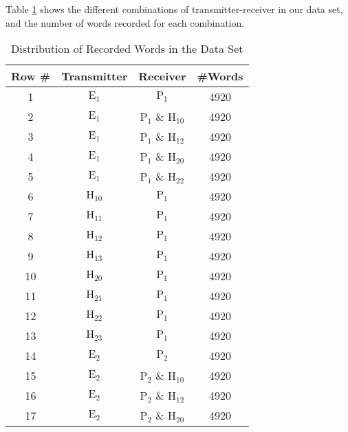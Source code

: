 \documentclass[compsoc,conference,a4paper]{IEEEtran}
\begin{document}
  Table \ref{tab:RecordingsSummery} shows the different combinations of transmitter-receiver in our data set, and the number of words recorded for each combination.
  
  \begin{table}
    \caption{Distribution of Recorded Words in the Data Set}
    \label{tab:RecordingsSummery}
    \centering
    \begin{tabular}{|c | c c c|} 
      \hline
      Row \# & Transmitter & Receiver & \#Words \\ [0.5ex] 
      \hline\hline
      1 & \(\text{E}_1\) & \(\text{P}_1\) & 4920 \\ %
      \hline
      2 & \(\text{E}_1\) & \(\text{P}_1\) \& \(\text{H}_{10}\) & 4920 \\
      \hline
      3 & \(\text{E}_1\) & \(\text{P}_1\) \& \(\text{H}_{12}\) & 4920 \\
      \hline
      4 & \(\text{E}_1\) & \(\text{P}_1\) \& \(\text{H}_{20}\) & 4920 \\
      \hline
      5 & \(\text{E}_1\) & \(\text{P}_1\) \& \(\text{H}_{22}\) & 4920 \\
      \hline
      6 & \(\text{H}_{10}\) & \(\text{P}_1\) & 4920 \\
      \hline
      7 & \(\text{H}_{11}\) & \(\text{P}_1\) & 4920 \\
      \hline
      8 & \(\text{H}_{12}\) & \(\text{P}_1\) & 4920 \\
      \hline
      9 & \(\text{H}_{13}\) & \(\text{P}_1\) & 4920 \\
      \hline
      10 & \(\text{H}_{20}\) & \(\text{P}_1\) & 4920 \\
      \hline
      11 & \(\text{H}_{21}\) & \(\text{P}_1\) & 4920 \\
      \hline
      12 & \(\text{H}_{22}\) & \(\text{P}_1\) & 4920 \\
      \hline
      13 & \(\text{H}_{23}\) & \(\text{P}_1\) & 4920 \\
      \hline
      14 & \(\text{E}_2\) & \(\text{P}_2\) & 4920 \\ %
      \hline
      15 & \(\text{E}_2\) & \(\text{P}_2\) \& \(\text{H}_{10}\) & 4920 \\
      \hline
      16 & \(\text{E}_2\) & \(\text{P}_2\) \& \(\text{H}_{12}\) & 4920 \\
      \hline
      17 & \(\text{E}_2\) & \(\text{P}_2\) \& \(\text{H}_{20}\) & 4920 \\

\end{tabular}
\end{table}
\end{document}
